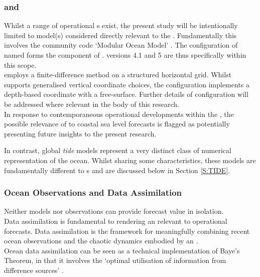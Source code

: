 \subsubsection{\BL{} and \MOM{}}
Whilst a range of operational \OGCM{}s exist, the present study will be intentionally limited to model(s) considered directly relevant to the \BOM{}.   Fundamentally this involves the community code `Modular Ocean Model' \MOM{} \citep{Griffies:2008vh}.  The configuration of \MOM{} named \OFAM{} forms the \OGCM{} component of \BL{} \cite{Brassington:2012wm}.  \MOM{} versions 4.1 and 5 are thus specifically within this scope.\\
\MOM{}  employs a finite-difference method on a structured horizontal grid.  Whilst \MOM{} supports generalised vertical coordinate choices, the \OFAM{} configuration implements a depth-based coordinate with a free-surface.  Further details of configuration will be addressed where relevant in the body of this research.\\
In response to contemporaneous operational developments within the \BOM{}, the possible relevance of \ROMS{} \cite{Shchepetkin:2005eh} to coastal sea level forecasts is flagged as potentially presenting future insights to the present research.


In contrast, global \emph{tide} models represent a very distinct class of numerical representation of the ocean.  Whilst sharing some characteristics, these models are fundamentally different to \OGCM{}s and are discussed below in Section \ref{S:TIDE}.

\subsubsection{Ocean Observations and Data Assimilation}
Neither models nor observations can provide forecast value in isolation.   \\




Data assimilation is fundamental to rendering an \OGCM{} relevant to operational forecasts.  Data assimilation is the framework for meaningfully combining recent ocean observations and the chaotic dynamics embodied by an \OGCM{}.\\
Ocean data assimilation can be seen as a technical implementation of Baye's Theorem, in that it involves the `optimal utilisation of information from difference sources' \citep{Zaron:2011ft}.\\



